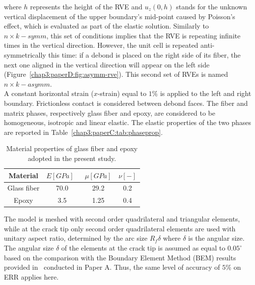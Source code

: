 where $h$ represents the height of the RVE and $u_{z}\left(0,h\right)$ stands for the unknown vertical displacement of the upper boundary's mid-point caused by Poisson's effect, which is evaluated as part of the elastic solution. Similarly to $n\times k-symm$, this set of conditions implies that the RVE is repeating infinite times in the vertical direction. However, the unit cell is repeated anti-symmetrically this time: if a debond is placed on the right side of its fiber, the next one aligned in the vertical direction will appear on the left side (Figure~\ref{chap3:paperD:fig:asymm-rve}). This second set of RVEs is named $n\times k-asymm$.\\
A constant horizontal strain ($x$-strain) equal to $1\%$ is applied to the left and right boundary. Frictionless contact is considered between debond faces. The fiber and matrix phases, respectively glass fiber and epoxy, are considered to be homogeneous, isotropic and linear elastic. The elastic properties of the two phases are reported in Table~\ref{chap3:paperC:tab:phaseprop}.

\begin{table}[!h]
 \centering
 \caption{Material properties of glass fiber and epoxy adopted in the present study.}
 \begin{tabular}{cccc}
\\
\textbf{Material} & \textbf{$E\left[GPa\right]$}\ & \textbf{$\mu\left[GPa\right]$} & \textbf{$\nu\left[-\right]$} \\
\midrule
Glass fiber    & 70.0  & 29.2   & 0.2  \\
Epoxy    & 3.5    & 1.25   & 0.4
\end{tabular}
\label{chap3:paperD:tab:phaseprop}
\end{table}

The model is meshed with second order quadrilateral and triangular elements, while at the crack tip only second order quadrilateral elements are used with unitary aspect ratio, determined by the arc size $R_{f}\delta$ where $\delta$ is the angular size. The angular size $\delta$ of the elements at the crack tip is assumed as equal to $0.05^{\circ}$ based on the comparison with the Boundary Element Method (BEM) results provided in~\cite{Paris2007,Sandino2016} conducted in Paper A. Thus, the same level of accuracy of $5\%$ on ERR applies here.

